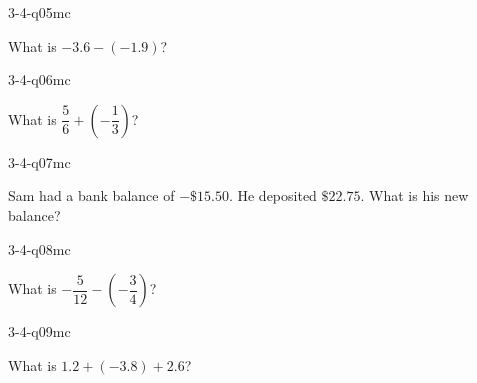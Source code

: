 \begin{practiceQuestion}{3-4-q05}{mc}
\begin{questionText}
What is $-3.6 - (-1.9)$?
\end{questionText}
\end{practiceQuestion}

\begin{practiceQuestion}{3-4-q06}{mc}
\begin{questionText}
What is $\dfrac{5}{6} + \left(-\dfrac{1}{3}\right)$?
\end{questionText}
\end{practiceQuestion}

\begin{practiceQuestion}{3-4-q07}{mc}
\begin{questionText}
Sam had a bank balance of $-\$15.50$. He deposited $\$22.75$. What is his new balance?
\end{questionText}
\end{practiceQuestion}

\begin{practiceQuestion}{3-4-q08}{mc}
\begin{questionText}
What is $-\dfrac{5}{12} - \left(-\dfrac{3}{4}\right)$?
\end{questionText}
\end{practiceQuestion}

\begin{practiceQuestion}{3-4-q09}{mc}
\begin{questionText}
What is $1.2 + (-3.8) + 2.6$?
\end{questionText}
\end{practiceQuestion}

